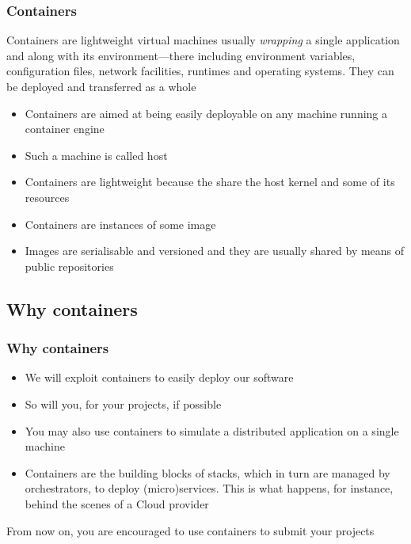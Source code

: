 \documentclass[handout]{beamer}\mode<presentation>{\usetheme{AMSCesenaBleu}}
\begin{document}
\begin{frame}
\frametitle{Containers}

    \begin{block}{}
        Containers are \alert{lightweight} virtual machines usually \emph{wrapping} a \alert{single application} and along with its \alert{environment}---there including environment variables, configuration files, network facilities, runtimes and operating systems. They can be deployed and transferred as a whole
    \end{block}
    \begin{itemize}
        \item<2> Containers are aimed at being easily deployable on any machine running a container \alert{engine}
        \item<3> Such a machine is called \alert{host}
        \item<4> Containers are \alert{lightweight} because the share the host kernel and some of its resources
        \item<5> Containers are instances of some \alert{image}
        \item<6> Images are serialisable and versioned and they are usually shared by means of public \alert{repositories}
    \end{itemize}
    
    
\end{frame}

\subsection{Why containers}

\begin{frame}
\frametitle{Why containers}

    \begin{itemize}
        \item We will exploit containers to easily deploy our software
        \pause
        \item So will you, for your projects, if possible
        \pause
        \item You may also use containers to simulate a distributed application on a single machine
        \pause
        \item Containers are the building blocks of \alert{stacks}, which in turn are managed by \alert{orchestrators}, to deploy (\alert{micro})\alert{services}.
        This is what happens, for instance, behind the scenes of a \alert{Cloud} provider
        
    \end{itemize}
    
    \vspace{.3cm}\pause
    
    \begin{block}{}
        \alert{From now on}, you are \alert{encouraged} to use containers to submit your projects
    \end{block}

\end{frame}
\end{document}
